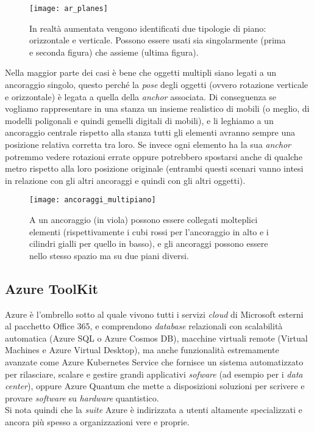 \begin{figure}[H]
  \centering
  \texttt{[image: ar\_planes]}
  \caption[Piani in realtà aumentata]{In realtà aumentata vengono identificati due tipologie di piano: orizzontale e verticale. Possono essere usati sia singolarmente (prima e seconda figura) che assieme (ultima figura).}
\end{figure}

Nella maggior parte dei casi è bene che oggetti multipli siano legati a un ancoraggio singolo, questo perché la \textit{pose} degli oggetti (ovvero rotazione verticale e orizzontale) è legata a quella della \textit{anchor} associata. Di conseguenza se vogliamo rappresentare in una stanza un insieme realistico di mobili (o meglio, di modelli poligonali e quindi gemelli digitali di mobili), e li leghiamo a un ancoraggio centrale rispetto alla stanza tutti gli elementi avranno sempre una posizione relativa corretta tra loro. Se invece ogni elemento ha la sua \textit{anchor} potremmo vedere rotazioni errate oppure potrebbero spostarsi anche di qualche metro rispetto alla loro posizione originale (entrambi questi scenari vanno intesi in relazione con gli altri ancoraggi e quindi con gli altri oggetti).

\begin{figure}[H]
  \centering
  \texttt{[image: ancoraggi\_multipiano]}
  \caption[Ancoraggi singoli per multipli elementi]{A un ancoraggio (in viola) possono essere collegati molteplici elementi (rispettivamente i cubi rossi per l'ancoraggio in alto e i cilindri gialli per quello in basso), e gli ancoraggi possono essere nello stesso spazio ma su due piani diversi.}
\end{figure}

\subsection{Azure ToolKit}
Azure è l'ombrello sotto al quale vivono tutti i servizi \textit{cloud} di Microsoft esterni al pacchetto Office 365, e comprendono \textit{database} relazionali con scalabilità automatica (Azure SQL o Azure Cosmos DB), macchine virtuali remote (Virtual Machines e Azure Virtual Desktop), ma anche funzionalità estremamente avanzate come Azure Kubernetes Service che fornisce un sistema automatizzato per rilasciare, scalare e gestire grandi applicativi \textit{sofware} (ad esempio per i \textit{data center}), oppure Azure Quantum che mette a disposizioni soluzioni per scrivere e provare \textit{software} su \textit{hardware} quantistico.\\
Si nota quindi che la \textit{suite} Azure è indirizzata a utenti altamente specializzati e ancora più spesso a organizzazioni vere e proprie.

